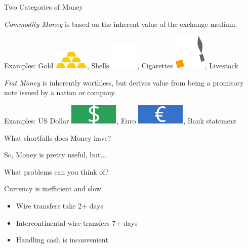 \documentclass[12pt, usepdftitle=false]{beamer}
\begin{document}
\begin{frame}{Two Categories of Money} 
\pause
		\begin{definition}
		\emph{Commodity Money} is based on the inherent value of the exchange medium.
		\end{definition}
		Examples: \pause Gold \includegraphics[width=.05\textwidth]{commodity.pdf}, Shells \includegraphics[width=.04\textwidth]{shells.pdf}, Cigarettes \includegraphics[width=.05\textwidth]{cigarettes.pdf}, Livestock
	\vspace{1em}
\pause

		\begin{definition}
		\emph{Fiat Money} is inherently worthless, but derives value from being a promisory note issued by a nation or company.
		\end{definition}
		Examples: \pause US Dollar \includegraphics[width=.07\textwidth]{dollar.pdf}, Euro \includegraphics[width=.07\textwidth]{euro.pdf}, Bank statement
\end{frame}


\begin{frame}{What shortfalls does Money have?}

	\begin{center}
		So, Money is pretty useful, but... \pause
	\vspace{1em}

		\alert{What problems can you think of?}
	\end{center}

\end{frame}

\begin{frame}{Currency is inefficient and slow}
	\begin{itemize}
		\item Wire transfers take 2+ days
		\item Intercontinental wire transfers 7+ days
		\item Handling cash is inconvenient
	\end{itemize}
\end{frame}
\end{document}

